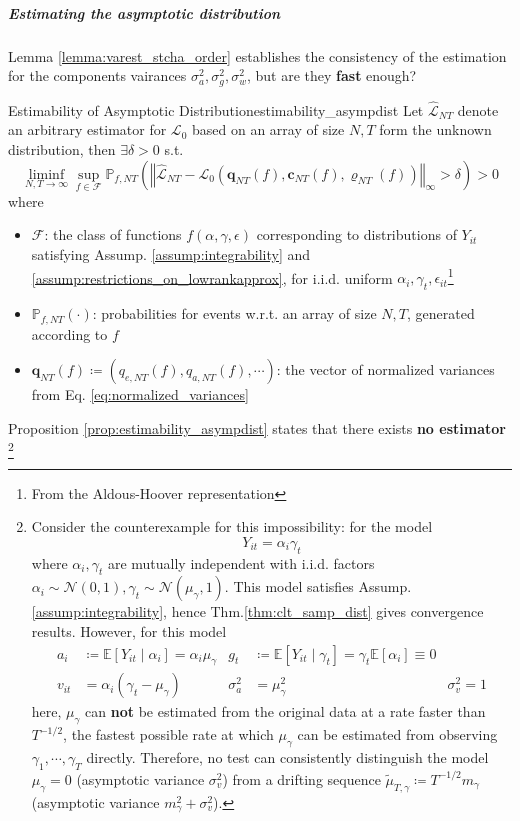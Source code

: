 \documentclass[twoside]{article}
\begin{document}
\subparagraph*{Estimating the asymptotic distribution}
Lemma \ref{lemma:varest_stcha_order} establishes the consistency of the estimation for the components vairances $\sigma^2_a,\sigma^2_g,\sigma^2_w$, but are they \textbf{fast} enough?
\begin{proposition}{Estimability of Asymptotic Distribution}{estimability_asympdist}
    Let $\hat{\mathcal{L}}_{NT}$ denote an arbitrary estimator for $\mathcal{L}_0$ based on an array of size $N,T$ form the unknown distribution, then $\exists \delta>0$ s.t. 
    \begin{equation*}
        \liminf_{N,T\rightarrow\infty} \sup_{f\in\mathcal{F}} \mathbb{P}_{f,NT} \left( \left\Vert \hat{\mathcal{L}}_{NT} - \mathcal{L}_0 \left(\mathbf{q}_{NT}(f),\mathbf{c}_{NT}(f),\varrho_{NT}(f)\right) \right\Vert _{\infty} > \delta \right) >0
    \end{equation*}
    where
    \begin{itemize}
        \item $\mathcal{F}$: the class of functions $f(\alpha,\gamma,\epsilon)$ corresponding to distributions of $Y_{it}$ satisfying Assump. \ref{assump:integrability} and \ref{assump:restrictions_on_lowrankapprox}, for i.i.d. uniform $\alpha_i,\gamma_t,\epsilon_{it}$\footnote{From the Aldous-Hoover representation}
        \item $\mathbb{P}_{f,NT}\left(\cdot\right)$: probabilities for events w.r.t. an array of size $N,T$, generated according to $f$
        \item $\mathbf{q}_{NT}(f) \coloneq \left(q_{e,NT}(f),q_{a,NT}(f),\cdots\right)$: the vector of normalized variances from Eq. \ref{eq:normalized_variances}
    \end{itemize}
\end{proposition}
Proposition \ref{prop:estimability_asympdist} states that there exists \textbf{no estimator}
\footnote{Consider the counterexample for this impossibility: for the model $$Y_{it} = \alpha_i\gamma_t$$ where $\alpha_i,\gamma_t$ are mutually independent with i.i.d. factors $\alpha_i \sim \mathcal{N}(0,1),\gamma_t\sim\mathcal{N}(\mu_{\gamma},1)$. This model satisfies Assump.\ref{assump:integrability}, hence 
Thm.\ref{thm:clt_samp_dist} gives convergence results. However, for this model 
\begin{align*}
    a_i & \coloneq \mathbb{E}\left[Y_{it}\mid \alpha_i\right] = \alpha_i\mu_{\gamma} & g_t & \coloneq \mathbb{E}\left[Y_{it}\mid \gamma_t\right] = \gamma_t\mathbb{E}\left[\alpha_i\right]\equiv 0\\
    v_{it} & =\alpha_i(\gamma_t-\mu_{\gamma}) & \sigma^2_a&=\mu^2_{\gamma} & \sigma^2_v=1
\end{align*}
here, $\mu_{\gamma}$ can \textbf{not} be estimated from the original data at a rate faster than $T^{-1/2}$, the fastest possible rate at which $\mu_{\gamma}$ can be estimated from observing $\gamma_1,\cdots,\gamma_T$ directly. Therefore, no test can consistently distinguish the model $\mu_{\gamma}=0$ (asymptotic variance $\sigma^2_v$) from a drifting sequence $\tilde{\mu}_{T,\gamma}\coloneq T^{-1/2}m_{\gamma}$ (asymptotic variance $m^2_{\gamma}+\sigma^2_v$).}
\end{document}
